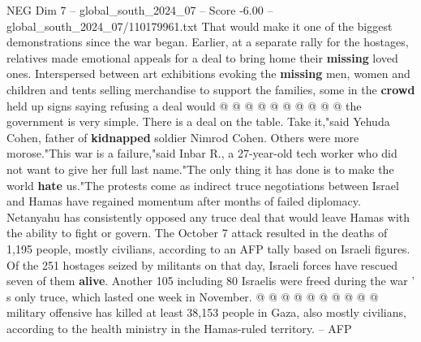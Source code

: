 \begin{textsample}{NEG Dim 7 – global\_south\_2024\_07 – Score -6.00 – global\_south\_2024\_07/110179961.txt}
That would make it one of the biggest demonstrations since the war began.
Earlier, at a separate rally for the hostages, relatives made emotional appeals for a deal to bring home their \textbf{missing} loved ones.
Interspersed between art exhibitions evoking the \textbf{missing} men, women and children and tents selling merchandise to support the families, some in the \textbf{crowd} held up signs saying refusing a deal would @ @ @ @ @ @ @ @ @ @ the government is very simple.
There is a deal on the table.
Take it,"said Yehuda Cohen, father of \textbf{kidnapped} soldier Nimrod Cohen.
Others were more morose."This war is a failure,"said Inbar R., a 27-year-old tech worker who did not want to give her full last name."The only thing it has done is to make the world \textbf{hate} us."The protests come as indirect truce negotiations between Israel and Hamas have regained momentum after months of failed diplomacy.
Netanyahu has consistently opposed any truce deal that would leave Hamas with the ability to fight or govern.
The October 7 attack resulted in the deaths of 1,195 people, mostly civilians, according to an AFP tally based on Israeli figures.
Of the 251 hostages seized by militants on that day, Israeli forces have rescued seven of them \textbf{alive}.
Another 105 including 80 Israelis were freed during the war ' s only truce, which lasted one week in November. @ @ @ @ @ @ @ @ @ @ military offensive has killed at least 38,153 people in Gaza, also mostly civilians, according to the health ministry in the Hamas-ruled territory. -- AFP

\end{textsample}
